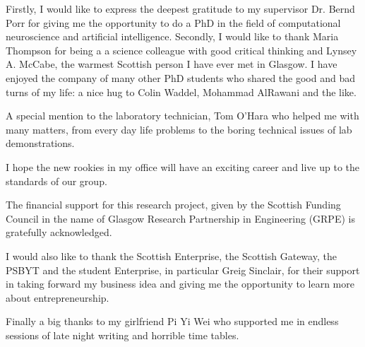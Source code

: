 
Firstly, I would like to express the deepest gratitude to my supervisor
Dr. Bernd Porr for giving me the opportunity to do a PhD in the field
 of computational neuroscience and artificial intelligence.
Secondly, I would like to thank Maria Thompson for being a
a science colleague with good critical thinking and Lynsey A. McCabe, the warmest Scottish
person I have ever met in Glasgow.
I have enjoyed the company of many other PhD students who shared the good and bad turns of
my life: a nice hug to Colin Waddel, Mohammad AlRawani and the like.

A special mention to the laboratory technician, Tom O'Hara who
helped me with many matters, from every day life problems to the
boring technical issues of lab demonstrations.

I hope the new rookies in my office will have an exciting career and live
up to the standards of our group.

The financial support for this research project, given by the Scottish Funding Council
in the name of Glasgow Research Partnership in Engineering (GRPE) is gratefully
acknowledged.

I would also like to thank the Scottish Enterprise, the Scottish Gateway, the PSBYT and
the student Enterprise, in particular Greig Sinclair, for their support in taking
forward my business idea and giving me the opportunity to learn more about
entrepreneurship.

Finally a big thanks to my girlfriend Pi Yi Wei who supported me in endless
sessions of late night writing and horrible time tables.


